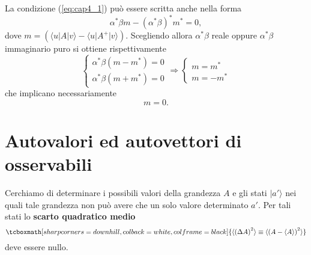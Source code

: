 La condizione (\ref{eq:cap4_1}) può essere scritta anche nella forma
	\begin{equation}
		\alpha ^* \beta m - \left( \alpha ^*  \beta \right) ^* m^* =0, 
	\end{equation}
dove $m= \left( \langle u \vert A \vert v \rangle - \langle u \vert A^{+} \vert v \rangle \right)$. Scegliendo allora $\alpha ^* \beta$ reale oppure $\alpha ^* \beta$ immaginario puro si ottiene rispettivamente
	\begin{equation}
		\begin{cases}
		\alpha ^* \beta \left( m- m^* \right) =0 \\
		\alpha ^* \beta \left( m + m^* \right) =0
		\end{cases}
		\Rightarrow
		\begin{cases}
		m= m^*\\
		m= - m^*
		\end{cases}
	\end{equation}
che implicano necessariamente
	\begin{equation}
		m=0.
	\end{equation}
\section{Autovalori ed autovettori di osservabili}
Cerchiamo di determinare i possibili valori della grandezza $A$ e gli stati $\vert a' \rangle$ nei quali tale grandezza non può avere che un solo valore determinato $a'$. Per tali stati lo \textbf{scarto quadratico medio} 	
	\begin{equation}
		\tcboxmath[sharp corners=downhill, colback=white, colframe=black]{
			\langle \left( \Delta A \right) ^2 \rangle \equiv \langle \left( A- \langle A\rangle \right) ^2 \rangle
			}
	\end{equation}
deve essere nullo.\\

